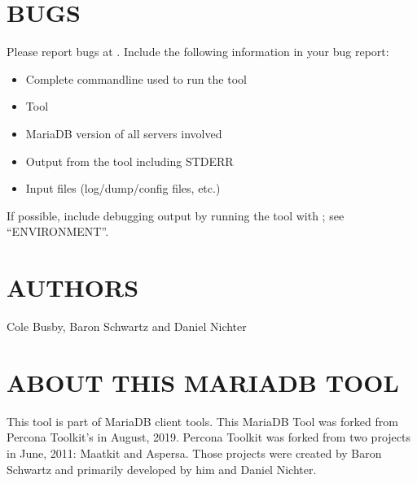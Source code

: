 \documentclass[letterpaper,10pt,english]{sphinxmanual}
\begin{document}
\section{BUGS}
\label{\detokenize{mariadb-config-diff:bugs}}
\sphinxAtStartPar
Please report bugs at .
Include the following information in your bug report:
\begin{itemize}
\item {} 
\sphinxAtStartPar
Complete command\sphinxhyphen{}line used to run the tool

\item {} 
\sphinxAtStartPar
Tool {\hyperref[\detokenize{mariadb-config-diff:cmdoption-mariadb-config-diff-version}]{}}

\item {} 
\sphinxAtStartPar
MariaDB version of all servers involved

\item {} 
\sphinxAtStartPar
Output from the tool including STDERR

\item {} 
\sphinxAtStartPar
Input files (log/dump/config files, etc.)

\end{itemize}

\sphinxAtStartPar
If possible, include debugging output by running the tool with ;
see “ENVIRONMENT”.


\section{AUTHORS}
\label{\detokenize{mariadb-config-diff:authors}}
\sphinxAtStartPar
Cole Busby, Baron Schwartz and Daniel Nichter


\section{ABOUT THIS MARIADB TOOL}
\label{\detokenize{mariadb-config-diff:about-this-mariadb-tool}}
\sphinxAtStartPar
This tool is part of MariaDB client tools. This MariaDB Tool was forked from
Percona Toolkit’s  in August, 2019. Percona Toolkit was forked from two
projects in June, 2011: Maatkit and Aspersa.  Those projects were created by
Baron Schwartz and primarily developed by him and Daniel Nichter.
\end{document}
